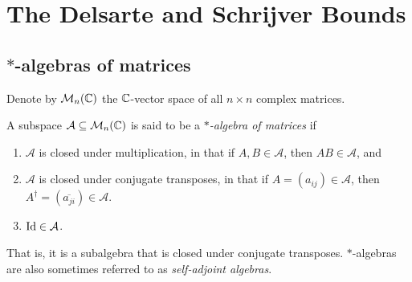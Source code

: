 
\section{The Delsarte and Schrijver Bounds}

\subsection{$*$-algebras of matrices}

	Denote by $\mathcal{M}_n(\mathbb{C})$ the $\mathbb{C}$-vector space of all $n \times n$ complex matrices.

	\begin{fdef}
		A subspace $\mathcal{A} \subseteq \mathcal{M}_n(\mathbb{C})$ is said to be a \emph{$*$-algebra of matrices} if
		\begin{enumerate}[label=(\alph*)]
			\item $\mathcal{A}$ is closed under multiplication, in that if $A,B \in \mathcal{A}$, then $AB \in \mathcal{A}$, and
			\item $\mathcal{A}$ is closed under conjugate transposes, in that if $A = (a_{ij}) \in \mathcal{A}$, then $A^\dagger = (\overline{a_{ji}}) \in \mathcal{A}$.
			\item $\operatorname{Id} \in \mathcal{A}$.
		\end{enumerate}
	\end{fdef}

	That is, it is a subalgebra that is closed under conjugate transposes. $*$-algebras are also sometimes referred to as \emph{self-adjoint algebras}.\\

